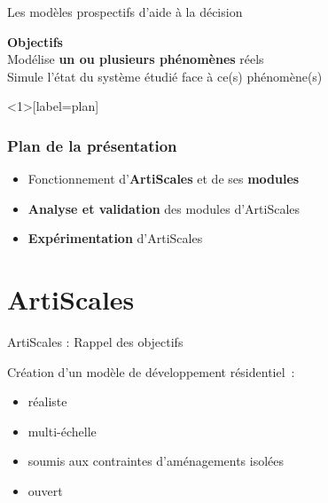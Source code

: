 \documentclass[xcolor=table]{beamer}
\begin{document}
\begin{frame}{Les modèles prospectifs d'aide à la décision}
\begin{block}{}
	\textbf{Objectifs}\\
	Modélise \textbf{un ou plusieurs phénomènes} réels\\
	Simule l'état du système étudié face à ce(s) phénomène(s)\\
\end{block}
\end{frame}




\begin{frame}<1>[label=plan]
\frametitle{Plan de la présentation}
	\begin{itemize}
		\item Fonctionnement d'\textbf{ArtiScales} et de ses \textbf{modules}
		\item \textbf{Analyse et validation} des modules d'ArtiScales
		\item \textbf{Expérimentation} d'ArtiScales
	\end{itemize}
\end{frame}




\section{ArtiScales}

\begin{frame}{ArtiScales : Rappel des objectifs}
		\begin{block}{}
		Création d'un modèle de développement résidentiel~:
		\begin{itemize}
			\footnotesize
			\item réaliste %
			\item multi-échelle %
			\item soumis aux contraintes d'aménagements isolées %
			\item ouvert %
		\end{itemize}
	\end{block}
\end{frame}
\end{document}
